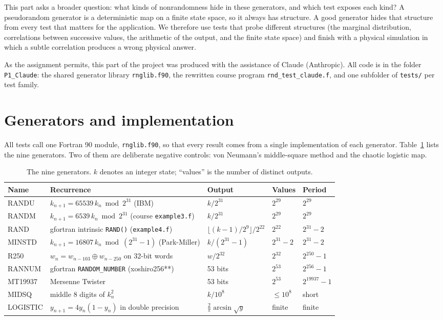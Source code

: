 \documentclass[11pt]{article}
\begin{document}
This part asks a broader question: what kinds of nonrandomness hide in these generators, and which test exposes each kind? A pseudorandom generator is a deterministic map on a finite state space, so it always has structure. A good generator hides that structure from every test that matters for the application. We therefore use tests that probe different structures (the marginal distribution, correlations between successive values, the arithmetic of the output, and the finite state space) and finish with a physical simulation in which a subtle correlation produces a wrong physical answer.

As the assignment permits, this part of the project was produced with the assistance of Claude (Anthropic). All code is in the folder \texttt{P1\_Claude}: the shared generator library \texttt{rnglib.f90}, the rewritten course program \texttt{rnd\_test\_claude.f}, and one subfolder of \texttt{tests/} per test family.

\section{Generators and implementation}

All tests call one Fortran 90 module, \texttt{rnglib.f90}, so that every result comes from a single implementation of each generator. Table~\ref{tab:gens} lists the nine generators. Two of them are deliberate negative controls: von Neumann's middle-square method and the chaotic logistic map.

\begin{table}[htbp]\centering\small
\caption{The nine generators. $k$ denotes an integer state; ``values'' is the number of distinct outputs.}\label{tab:gens}
\begin{tabular}{@{}l>{\raggedright}p{5.6cm}lll@{}}
\toprule
Name & Recurrence & Output & Values & Period \\
\midrule
RANDU & $k_{n+1} = 65539\,k_n \bmod 2^{31}$ (IBM) & $k/2^{31}$ & $2^{29}$ & $2^{29}$ \\
RANDM & $k_{n+1} = 6539\,k_n \bmod 2^{31}$ (course \texttt{example3.f}) & $k/2^{31}$ & $2^{29}$ & $2^{29}$ \\
RAND & gfortran intrinsic \texttt{RAND()} (\texttt{example4.f}) & $\lfloor (k-1)/2^9\rfloor/2^{22}$ & $2^{22}$ & $2^{31}-2$ \\
MINSTD & $k_{n+1} = 16807\,k_n \bmod (2^{31}-1)$ (Park-Miller) & $k/(2^{31}-1)$ & $2^{31}-2$ & $2^{31}-2$ \\
R250 & $w_n = w_{n-103}\oplus w_{n-250}$ on 32-bit words & $w/2^{32}$ & $2^{32}$ & $2^{250}-1$ \\
RANNUM & gfortran \texttt{RANDOM\_NUMBER} (xoshiro256**) & 53 bits & $2^{53}$ & $2^{256}-1$ \\
MT19937 & Mersenne Twister & 53 bits & $2^{53}$ & $2^{19937}-1$ \\
MIDSQ & middle 8 digits of $k_n^2$ & $k/10^{8}$ & $\le 10^8$ & short \\
LOGISTIC & $y_{n+1} = 4y_n(1-y_n)$ in double precision & $\tfrac{2}{\pi}\arcsin\sqrt{y}$ & finite & finite \\
\bottomrule
\end{tabular}
\end{table}
\end{document}
